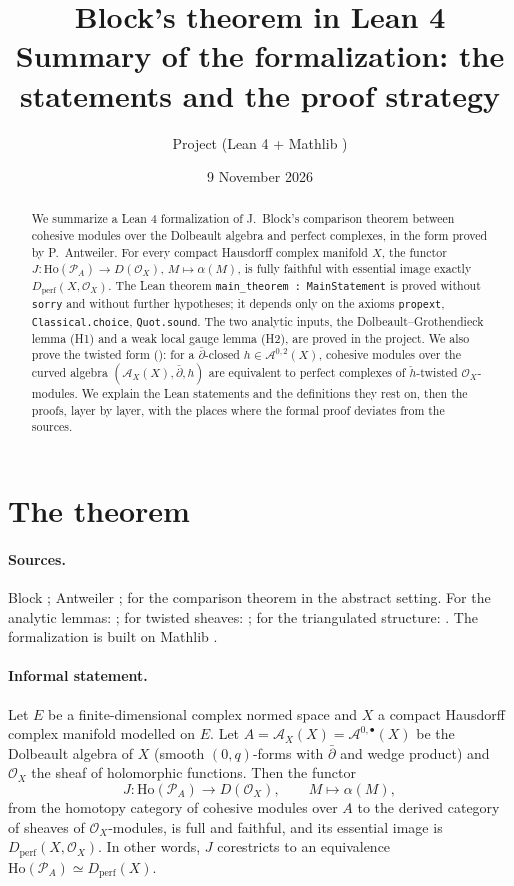 \documentclass[11pt,a4paper]{article}
\title{Block's theorem in Lean 4\\[4pt]
\large Summary of the formalization: the statements and the proof strategy}
\author{Project \code{cohesivemodules} (Lean 4 + Mathlib \code{v4.35.0})}
\date{9 November 2026}
\newcommand{\code}[1]{\texttt{#1}}
\newcommand{\cA}{\mathcal{A}}
\newcommand{\Ocal}{\mathcal{O}}
\newcommand{\dbar}{\bar\partial}
\newcommand{\Ho}{\mathrm{Ho}}
\newcommand{\Dperf}{D_{\mathrm{perf}}}
\newcommand{\hc}{\check h}
\begin{document}
\maketitle

\begin{abstract}
We summarize a Lean 4 formalization of J.~Block's comparison theorem between cohesive modules
over the Dolbeault algebra and perfect complexes, in the form proved by P.~Antweiler. For every
compact Hausdorff complex manifold $X$, the functor
$J\colon \Ho(\mathcal P_A)\to D(\Ocal_X)$, $M\mapsto\alpha(M)$, is fully faithful with essential
image exactly $\Dperf(X,\Ocal_X)$. The Lean theorem \code{main\_theorem : MainStatement} is proved
without \code{sorry} and without further hypotheses; it depends only on the axioms
\code{propext}, \code{Classical.choice}, \code{Quot.sound}. The two analytic inputs, the
Dolbeault--Grothendieck lemma (H1) and a weak local gauge lemma (H2), are proved in the project.
We also prove the twisted form (\cite[Thm~7.4.3]{A}): for a $\dbar$-closed $h\in\cA^{0,2}(X)$, cohesive
modules over the curved algebra $(\cA_X(X),\dbar,h)$ are equivalent to perfect complexes of
$\hc$-twisted $\Ocal_X$-modules. We explain the Lean statements and the definitions they rest on,
then the proofs, layer by layer, with the places where the formal proof deviates from the
sources.
\end{abstract}

\tableofcontents

\section{The theorem}

\paragraph{Sources.} Block \cite[Thm~4.1.3]{B}; Antweiler \cite[Thm~7.2.20 and Thm~7.4.3]{A};
\cite{CHL} for the comparison theorem in the abstract setting. For the analytic lemmas:
\cite{Hor, GH, DK, BSW}; for twisted sheaves: \cite{Cal, Toda}; for the triangulated structure:
\cite{BK}. The formalization is built on Mathlib \cite{Mathlib}.

\paragraph{Informal statement.} Let $E$ be a finite-dimensional complex normed space and $X$ a
compact Hausdorff complex manifold modelled on $E$. Let $A=\cA_X(X)=\cA^{0,\bullet}(X)$ be the
Dolbeault algebra of $X$ (smooth $(0,q)$-forms with $\dbar$ and wedge product) and $\Ocal_X$ the
sheaf of holomorphic functions. Then the functor
\[ J\colon \Ho(\mathcal P_A)\longrightarrow D(\Ocal_X),\qquad M\longmapsto \alpha(M), \]
from the homotopy category of cohesive modules over $A$ to the derived category of sheaves of
$\Ocal_X$-modules, is full and faithful, and its essential image is $\Dperf(X,\Ocal_X)$. In other
words, $J$ corestricts to an equivalence $\Ho(\mathcal P_A)\simeq\Dperf(X)$.
\end{document}
